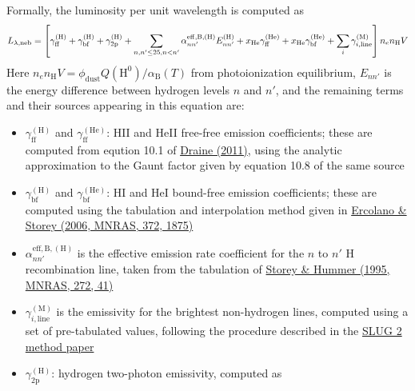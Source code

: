 \documentclass[letterpaper,10pt,english]{sphinxmanual}
\begin{document}
Formally, the luminosity per unit wavelength is computed as
\begin{gather}
\begin{split}L_{\lambda,\mathrm{neb}} = \left[\gamma_{\mathrm{ff}}^{(\mathrm{H})} + \gamma_{\mathrm{bf}}^{(\mathrm{H})} + \gamma_{\mathrm{2p}}^{(\mathrm{H})} + \sum_{n,n' \leq 25, n<n'} \alpha_{nn'}^{\mathrm{eff,B,(H)}} E_{nn'}^{(\mathrm{H})} +  x_{\mathrm{He}} \gamma_{\mathrm{ff}}^{(\mathrm{He})} +  x_{\mathrm{He}} \gamma_{\mathrm{bf}}^{(\mathrm{He})} + \sum_i \gamma_{i,\mathrm{line}}^{(\mathrm{M})}\right] n_e n_{\mathrm{H}}{V}\end{split}\notag
\end{gather}
Here \(n_e n_{\mathrm{H}} V = \phi_{\mathrm{dust}} Q(\mathrm{H}^0)/ \alpha_{\mathrm{B}}(T)\) from photoionization equilibrium, \(E_{nn'}\) is the energy difference between hydrogen levels \(n\) and \(n'\), and the remaining terms and their sources appearing in this equation are:
\begin{itemize}
\item {} 
\(\gamma_{\mathrm{ff}}^{(\mathrm{H})}\) and \(\gamma_{\mathrm{ff}}^{(\mathrm{He})}\): HII and HeII free-free emission coefficients; these are computed from eqution 10.1 of \href{http://adsabs.harvard.edu/abs/2011piim.book.....D}{Draine (2011)}, using the analytic approximation to the Gaunt factor given by equation 10.8 of the same source

\item {} 
\(\gamma_{\mathrm{bf}}^{(\mathrm{H})}\) and \(\gamma_{\mathrm{bf}}^{(\mathrm{He})}\): HI and HeI bound-free emission coefficients; these are computed using the tabulation and interpolation method given in \href{http://adsabs.harvard.edu/abs/2006MNRAS.372.1875E}{Ercolano \& Storey (2006, MNRAS, 372, 1875)}

\item {} 
\(\alpha_{nn'}^{\mathrm{eff,B,(H)}}\) is the effective emission rate coefficient for the \(n\) to \(n'\) H recombination line, taken from the tabulation of \href{http://adsabs.harvard.edu/abs/1995MNRAS.272...41S}{Storey \& Hummer (1995, MNRAS, 272, 41)}

\item {} 
\(\gamma_{i,\mathrm{line}}^{(\mathrm{M})}\) is the emissivity for the brightest non-hydrogen lines, computed using a set of pre-tabulated values, following the procedure described in the \href{http://adsabs.harvard.edu/abs/2015MNRAS.452.1447K}{SLUG 2 method paper}

\item {} 
\(\gamma_{\mathrm{2p}}^{(\mathrm{H})}\): hydrogen two-photon emissivity, computed as

\end{itemize}
\end{document}
